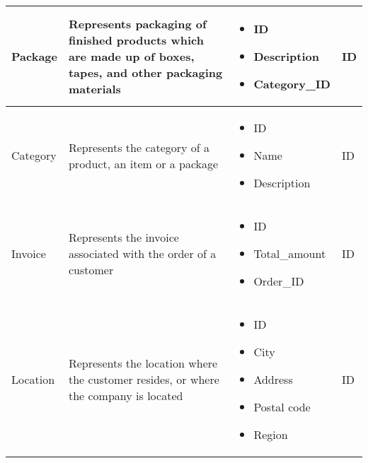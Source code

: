 \begin{longtable}{|p{}|p{} |p{}|p{} |}
    Package & Represents packaging of finished products which are made up of boxes, tapes, and other packaging materials &
    \begin{itemize}
        \vspace{-1em}
        \item ID
        \item Description
        \item Category\_ID %
    \end{itemize}
    &  ID \\\hline

    Category & Represents the category of a product, an item or a package &
    \begin{itemize}
        \vspace{-1em}
        \item ID
        \item Name
        \item Description
    \end{itemize}
    &  ID \\\hline

    Invoice & Represents the invoice associated with the order of a customer &
    \begin{itemize}
        \vspace{-1em}
        \item ID
        \item Total\_amount     %
        \item Order\_ID
    \end{itemize}
    &  ID \\\hline

    Location & Represents the location where the customer resides, or where the company is located &
        \begin{itemize}
            \vspace{-1em}
            \item ID
            \item City
            \item Address
            \item Postal code    %
            \item Region
        \end{itemize}
    &  ID \\\hline
\end{longtable}